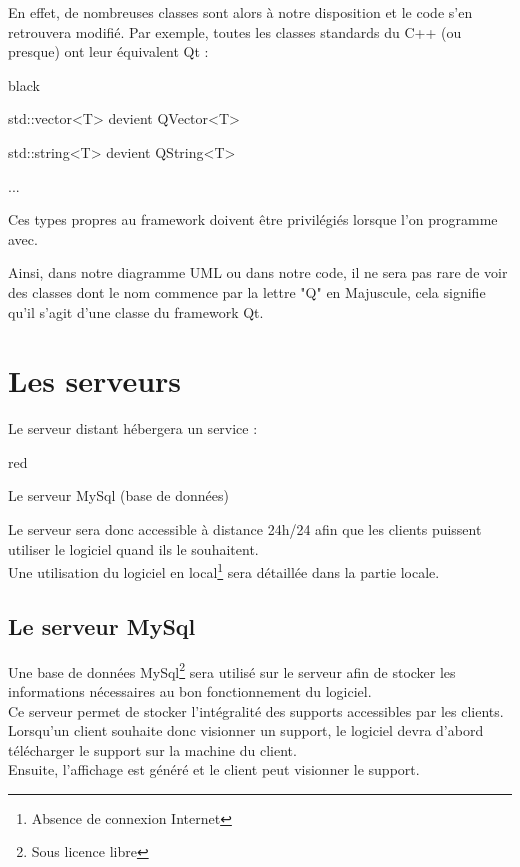 En effet, de nombreuses classes sont alors à notre disposition et le code s'en retrouvera modifié. Par exemple, toutes les classes standards du C++ (ou presque) ont leur équivalent Qt : 
\begin{items}{black}{\Circle}
    \item std::vector<T> devient QVector<T>
    \item std::string<T> devient QString<T>
    \item ...
\end{items} 

Ces types propres au framework doivent être privilégiés lorsque l'on programme avec.

Ainsi, dans notre diagramme UML ou dans notre code, il ne sera pas rare de voir des classes dont le nom commence par la lettre "Q" en Majuscule, cela signifie qu'il s'agit d'une classe du framework Qt.

\section{Les serveurs}

Le serveur distant hébergera un service : 
  \begin{items}{red}{\Circle}
    \item Le serveur MySql (base de données)
 \end{items}

Le serveur sera donc accessible à distance 24h/24 afin que les clients puissent utiliser le logiciel quand ils le souhaitent.\\
Une utilisation du logiciel en local\footnote{Absence de connexion Internet} sera détaillée dans la partie locale.

\subsection{Le serveur MySql}

Une base de données MySql\footnote{Sous licence libre} sera utilisé sur le serveur afin de stocker les informations nécessaires au bon fonctionnement du logiciel.\\

Ce serveur permet de stocker l'intégralité des supports accessibles par les clients.\\
Lorsqu'un client souhaite donc visionner un support, le logiciel devra d'abord télécharger le support sur la machine du client. \\
Ensuite, l'affichage est généré et le client peut visionner le support.


